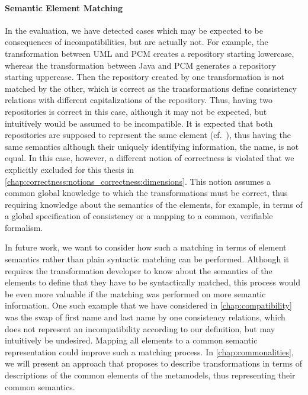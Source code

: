 \paragraph{Semantic Element Matching}
In the evaluation, we have detected cases which may be expected to be consequences of incompatibilities, but are actually not.
For example, the transformation between \gls{UML} and \gls{PCM} creates a repository starting lowercase, whereas the transformation between Java and \gls{PCM} generates a repository starting uppercase.
Then the repository created by one transformation is not matched by the other, which is correct as the transformations define consistency relations with different capitalizations of the repository.
Thus, having two repositories is correct in this case, although it may not be expected, but intuitively would be assumed to be incompatible.
It is expected that both repositories are supposed to represent the same element (cf.~\cite[Figure 6.4]{saglam2020ma}), thus having the same semantics although their uniquely identifying information, the name, is not equal.
In this case, however, a different notion of correctness is violated that we explicitly excluded for this thesis in \autoref{chap:correctness:notions_correctness:dimensions}.
This notion assumes a common global knowledge to which the transformations must be correct, thus requiring knowledge about the semantics of the elements, for example, in terms of a global specification of consistency or a mapping to a common, verifiable formalism.

In future work, we want to consider how such a matching in terms of element semantics rather than plain syntactic matching can be performed. 
Although it requires the transformation developer to know about the semantics of the elements to define that they have to be syntactically matched, this process would be even more valuable if the matching was performed on more semantic information.
One such example that we have considered in \autoref{chap:compatibility} was the swap of first name and last name by one consistency relations, which does not represent an incompatibility according to our definition, but may intuitively be undesired.
Mapping all elements to a common semantic representation could improve such a matching process.
In \autoref{chap:commonalities}, we will present an approach that proposes to describe transformations in terms of descriptions of the common elements of the metamodels, thus representing their common semantics.

